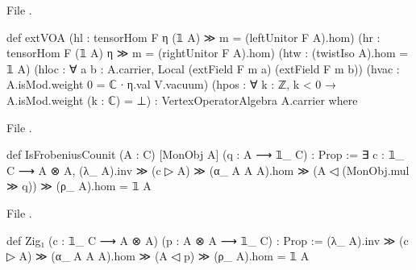 \noindent File .
\begin{leancode}
def extVOA (hl : tensorHom F η (𝟙 A) ≫ m = (leftUnitor F A).hom)
    (hr : tensorHom F (𝟙 A) η ≫ m = (rightUnitor F A).hom) (htw : (twistIso A).hom = 𝟙 A)
    (hloc : ∀ a b : A.carrier, Local (extField F m a) (extField F m b))
    (hvac : A.isMod.weight 0 = ℂ ∙ η.val V.vacuum)
    (hpos : ∀ k : ℤ, k < 0 → A.isMod.weight (k : ℂ) = ⊥) :
    VertexOperatorAlgebra A.carrier where
\end{leancode}
\noindent File .
\begin{leancode}
def IsFrobeniusCounit (A : C) [MonObj A] (q : A ⟶ 𝟙_ C) : Prop :=
  ∃ c : 𝟙_ C ⟶ A ⊗ A,
    (λ_ A).inv ≫ (c ▷ A) ≫ (α_ A A A).hom ≫ (A ◁ (MonObj.mul ≫ q)) ≫ (ρ_ A).hom = 𝟙 A
\end{leancode}
\noindent File .
\begin{leancode}
def Zig₁ (c : 𝟙_ C ⟶ A ⊗ A) (p : A ⊗ A ⟶ 𝟙_ C) : Prop :=
  (λ_ A).inv ≫ (c ▷ A) ≫ (α_ A A A).hom ≫ (A ◁ p) ≫ (ρ_ A).hom = 𝟙 A
\end{leancode}

